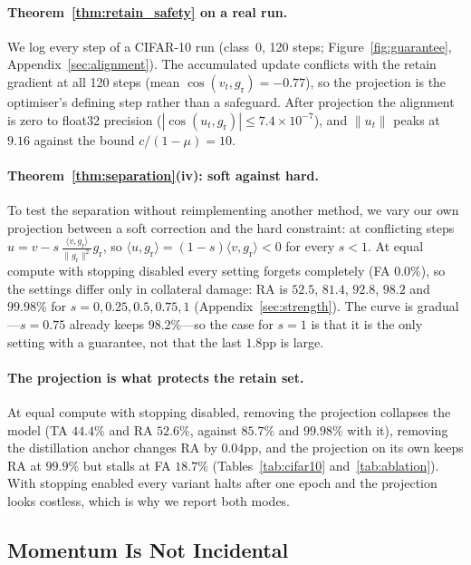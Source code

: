 \documentclass{article}
\newcommand{\gr}{g_{\mathrm{r}}}
\newcommand{\rev}[1]{{\color{revisedB}#1}}
\theoremstyle{remark}
\theoremstyle{plain}
\begin{document}
\rev{\paragraph{Theorem~\ref{thm:retain_safety} on a real run.}
We log every step of a CIFAR-10 run (class~0, 120 steps;
Figure~\ref{fig:guarantee}, Appendix~\ref{sec:alignment}). The accumulated update
conflicts with the retain gradient at all 120 steps (mean
$\cos(v_t,\gr) = -0.77$), so the projection is the optimiser's defining step
rather than a safeguard. After projection the alignment is zero to float32
precision ($|\cos(u_t,\gr)| \le 7.4\times10^{-7}$), and $\|u_t\|$ peaks at
$9.16$ against the bound $c/(1-\mu)=10$.

\paragraph{Theorem~\ref{thm:separation}(iv): soft against hard.}
To test the separation without reimplementing another method, we vary our own
projection between a soft correction and the hard constraint: at conflicting
steps $u = v - s\,\frac{\langle v,\gr\rangle}{\|\gr\|^2}\gr$, so
$\langle u,\gr\rangle = (1-s)\langle v,\gr\rangle < 0$ for every $s<1$. At equal
compute with stopping disabled every setting forgets completely (FA $0.0\%$), so
the settings differ only in collateral damage: RA is $52.5$, $81.4$, $92.8$,
$98.2$ and $99.98\%$ for $s = 0, 0.25, 0.5, 0.75, 1$ (Appendix~\ref{sec:strength}).
The curve is gradual---$s=0.75$ already keeps $98.2\%$---so the case for $s=1$
is that it is the only setting with a guarantee, not that the last $1.8$pp is
large.

\paragraph{The projection is what protects the retain set.}
At equal compute with stopping disabled, removing the projection collapses the
model (TA $44.4\%$ and RA $52.6\%$, against $85.7\%$ and $99.98\%$ with it),
removing the distillation anchor changes RA by $0.04$pp, and the projection on
its own keeps RA at $99.9\%$ but stalls at FA $18.7\%$
(Tables~\ref{tab:cifar10} and~\ref{tab:ablation}). With stopping enabled every
variant halts after one epoch and the projection looks costless, which is why we
report both modes.}

\subsection{Momentum Is Not Incidental}\label{sec:momentum_ablation}
\end{document}
